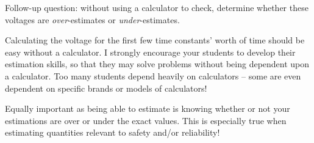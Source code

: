 \vskip 10pt

Follow-up question: without using a calculator to check, determine whether these voltages are {\it over}-estimates or {\it under}-estimates.







Calculating the voltage for the first few time constants' worth of time should be easy without a calculator.  I strongly encourage your students to develop their estimation skills, so that they may solve problems without being dependent upon a calculator.  Too many students depend heavily on calculators -- some are even dependent on specific brands or models of calculators!

Equally important as being able to estimate is knowing whether or not your estimations are over or under the exact values.  This is especially true when estimating quantities relevant to safety and/or reliability!




